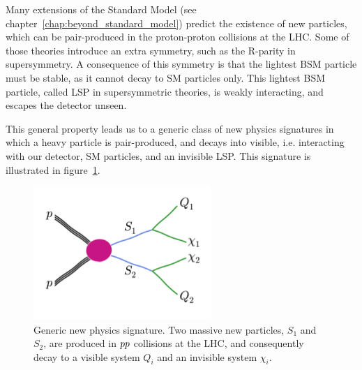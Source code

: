 

Many extensions of the Standard Model (see chapter~\ref{chap:beyond_standard_model}) predict the 
existence of new particles, which can be pair-produced in the proton-proton collisions at the LHC. 
Some of those theories introduce an extra symmetry, such as the R-parity in supersymmetry. A
consequence of this symmetry is that the lightest BSM particle must be stable, as it cannot decay
to SM particles only. This lightest BSM particle, called LSP in supersymmetric theories, is weakly
interacting, and escapes the detector unseen. 

This general property leads us to a generic class of new physics signatures in which a heavy
particle is pair-produced, and decays into visible, i.e. interacting with our detector, SM
particles, and an invisible LSP. This signature is illustrated in figure~\ref{fig:razor_signature}.

\begin{figure}[htb]
  \centering
  \includegraphics[width=0.6\textwidth,clip=true,trim=0 1.8cm 0
0.8cm]{figures/razor_variables/signature} 
  \caption{Generic new physics signature. Two massive new particles, $S_1$ and $S_2$, are produced
in ${p}{p}$ collisions at the LHC, and consequently decay to a visible system $Q_i$ and an invisible
system $\chi_i$. \label{fig:razor_signature}}
\end{figure}

